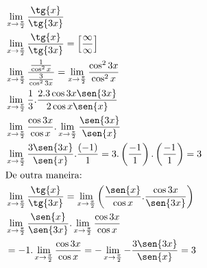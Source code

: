 \begin{ex}
\begin{align}
&\lim_{x\rightarrow \frac{\pi}{2}} \frac{\tg{x}}{\tg{3x}}\nonumber\\
&\lim_{x\rightarrow \frac{\pi}{2}} \frac{\tg{x}}{\tg{3x}}=\left[\frac{\infty}{\infty}\right]\nonumber\\
&\lim_{x\rightarrow \frac{\pi}{2}} \frac{\frac{1}{\cos^2{x}}}{\frac{3}{\cos^2{3x}}}=\lim_{x\rightarrow \frac{\pi}{2}} \frac{\cos^2{3x}}{\cos^2{x}}\nonumber\\
&\lim_{x\rightarrow \frac{\pi}{2}} \frac{1}{3}.\frac{2.3\cos{3x}\sen{3x}}{2\cos{x}\sen{x}}\nonumber\\
&\lim_{x\rightarrow \frac{\pi}{2}} \frac{\cos{3x}}{\cos{x}}.\lim_{x\rightarrow \frac{\pi}{2}} \frac{\sen{3x}}{\sen{x}}\nonumber\\
&\lim_{x\rightarrow \frac{\pi}{2}} \frac{3\sen{3x}}{\sen{x}}.\frac{(-1)}{1}=3.\left(\frac{-1}{1}\right).\left(\frac{-1}{1}\right)=3\nonumber\\
&\text{De outra maneira:}\nonumber\\
&\lim_{x\rightarrow \frac{\pi}{2}} \frac{\tg{x}}{\tg{3x}}=\lim_{x\rightarrow \frac{\pi}{2}} \left(\frac{\sen{x}}{\cos{x}}.\frac{\cos{3x}}{\sen{3x}}\right)\nonumber\\
&\lim_{x\rightarrow \frac{\pi}{2}} \frac{\sen{x}}{\sen{3x}}.\lim_{x\rightarrow  \frac{\pi}{2}} \frac{\cos{3x}}{\cos{x}}\nonumber\\
&=-1.\lim_{x\rightarrow \frac{\pi}{2}} \frac{\cos{3x}}{\cos{x}}=-\lim_{x\rightarrow \frac{\pi}{2}} -\frac{3\sen{3x}}{\sen{x}}=3\nonumber
\end{align}
\end{ex}